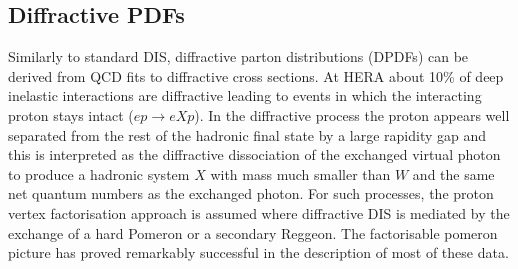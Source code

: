 %
%


\subsection{Diffractive PDFs}

\newcommand{\asotp}{\ensuremath{\frac{\alpha_{\rm s}}{2\pi}}}
\newcommand{\Sgl}[1]{\ensuremath{\tilde f_{#1+}}}
\newcommand{\Pom}{{I\!P}}
\newcommand{\Reg}{{I\!R}}
\newcommand{\xpom}{$x_{I\!P}$}


Similarly to standard DIS, diffractive parton distributions (DPDFs) 
can be derived from QCD fits to diffractive cross sections.
At HERA about 10\% of deep inelastic interactions are diffractive leading to
events in which the interacting proton stays intact ($ep\to eXp$). 
In the diffractive process the proton appears well separated from the 
rest of the hadronic final state by a large rapidity gap  
and this is interpreted as the diffractive dissociation 
of the exchanged virtual photon to produce a hadronic system $X$ with mass much 
smaller than $W$ and the same net quantum numbers as the exchanged photon.
For such processes, the proton vertex factorisation approach
is assumed where diffractive DIS is mediated by the exchange of a hard Pomeron 
or a
secondary Reggeon. 
The factorisable pomeron picture has proved remarkably successful in the description of most of these data.
%

